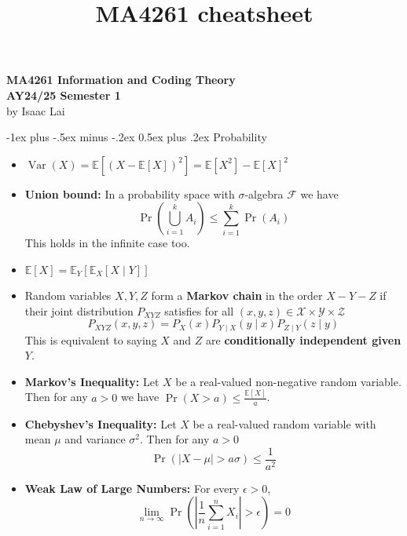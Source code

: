 \documentclass[frenchspacing,9pt,landscape,a4paper]{article}
\title{MA4261 cheatsheet}
\makeatletter
\renewcommand{\section}{\@startsection{section}{1}{0mm}%
                                {-1ex plus -.5ex minus -.2ex}%
                                {0.5ex plus .2ex}%
                                {\normalfont\large\bfseries}}
\newcommand{\abs}[1]{\left\lvert #1 \right\rvert}
\DeclareMathOperator{\pr}{Pr}
\DeclareMathOperator{\var}{Var}
\makeatother
\begin{document}
\raggedright
\footnotesize

\begin{multicols}{4} %
\setlength{\premulticols}{1pt}
\setlength{\postmulticols}{1pt}
\setlength{\multicolsep}{1pt}
\setlength{\columnsep}{2pt}
\begin{mdframed}
\begin{center}
    \large{\textbf{MA4261 Information and Coding Theory}} \\
    \normalsize{\textbf{AY24/25 Semester 1}}\\
    \small{by Isaac Lai}
\end{center}	
\end{mdframed}

\section{Probability}
\begin{itemize}
    \item $\var(X)=\mathbb{E}[(X-\mathbb{E}[X])^2]=\mathbb{E}[X^2]-\mathbb{E}[X]^2$
    \item \textbf{Union bound:} In a probability space with $\sigma$-algebra  $\mathcal{F}$ we have
        \[\pr\left(\bigcup_{i=1}^k A_i\right)\leq\sum_{i=1}^k\pr(A_i)\] This holds in the infinite case
        too.
    \item $\mathbb{E}[X]=\mathbb{E}_Y[\mathbb{E}_X[X\mid Y]]$
    \item Random variables $X,Y,Z$ form a \textbf{Markov chain} in the order  $X-Y-Z$ if their joint
        distribution $P_{XYZ}$ satisfies for all  $(x,y,z)\in\mathcal{X}\times\mathcal{Y}\times\mathcal{Z}$
        \[P_{XYZ}(x,y,z)=P_X(x)P_{Y\mid X}(y\mid x)P_{Z\mid Y}(z\mid y)\]
        This is equivalent to saying $X$ and  $Z$ are \textbf{conditionally independent given $Y$}.
    \item \textbf{Markov's Inequality:} Let $X$ be a real-valued non-negative random variable. Then for any
        $a>0$ we have  $\pr(X>a)\leq \frac{\mathbb{E}[X]}{a}$.
    \item \textbf{Chebyshev's Inequality:} Let $X$ be a real-valued random variable with mean  $\mu$ and
        variance  $\sigma^2$. Then for any $a>0$
        \[\pr(\abs{X-\mu}>a\sigma)\leq \frac{1}{a^2}\]
    \item \textbf{Weak Law of Large Numbers:} For every $\epsilon>0$,
        \[\lim_{n\to\infty}\pr\left(\abs{\frac{1}{n}\sum_{i=1}^n X_i}>\epsilon\right)=0\]
\end{itemize}

\end{multicols}
\end{document}
